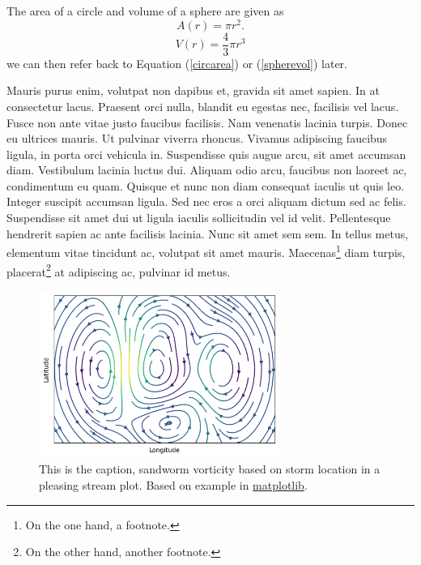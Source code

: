 The area of a circle and volume of a sphere are given as
\begin{equation}
    \label{circarea}
    A(r) = \pi r^2.
\end{equation}
\begin{equation}
    \label{spherevol}
    V(r) = \frac{4}{3} \pi r^3
\end{equation}
we can then refer back to Equation (\ref{circarea}) or
(\ref{spherevol}) later.

Mauris purus enim, volutpat non dapibus et, gravida sit amet sapien. In at
consectetur lacus. Praesent orci nulla, blandit eu egestas nec, facilisis vel
lacus. Fusce non ante vitae justo faucibus facilisis. Nam venenatis lacinia
turpis. Donec eu ultrices mauris. Ut pulvinar viverra rhoncus. Vivamus
adipiscing faucibus ligula, in porta orci vehicula in. Suspendisse quis augue
arcu, sit amet accumsan diam. Vestibulum lacinia luctus dui. Aliquam odio arcu,
faucibus non laoreet ac, condimentum eu quam. Quisque et nunc non diam
consequat iaculis ut quis leo. Integer suscipit accumsan ligula. Sed nec eros a
orci aliquam dictum sed ac felis. Suspendisse sit amet dui ut ligula iaculis
sollicitudin vel id velit. Pellentesque hendrerit sapien ac ante facilisis
lacinia. Nunc sit amet sem sem. In tellus metus, elementum vitae tincidunt ac,
volutpat sit amet mauris. Maecenas\footnote{On the one hand, a footnote.} diam
turpis, placerat\footnote{On the other hand, another footnote.} at adipiscing
ac, pulvinar id metus.

\begin{figure}[]
    \includegraphics[width=0.7\textwidth]{figure1.png}
    \caption{This is the caption, sandworm vorticity based on storm location in a pleasing stream plot. Based on example in \href{https://matplotlib.org/stable/plot_types/arrays/streamplot.html}{matplotlib}. \label{egfig}}
\end{figure}


